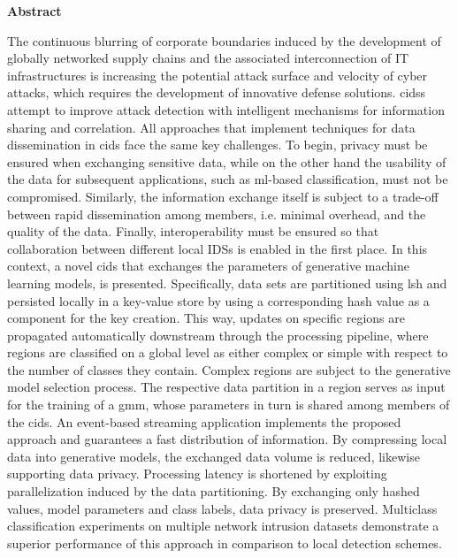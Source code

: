 \documentclass[../main.tex]{subfiles}
\begin{document}
\begingroup

\hspace{0pt}
\vfill
\begin{adjustwidth}{1.7cm}{1.7cm}
\begin{center}
    \small\textbf{Abstract}
\end{center}
\par\medskip

The continuous blurring of corporate boundaries induced by the development of globally networked supply chains and the associated interconnection of IT infrastructures is increasing the potential attack surface and velocity of cyber attacks, which requires the development of innovative defense solutions.
\glspl{cids} attempt to improve attack detection with intelligent mechanisms for information sharing and correlation.
All approaches that implement techniques for data dissemination in \gls{cids} face the same key challenges.
To begin, privacy must be ensured when exchanging sensitive data, while on the other hand the usability of the data for subsequent applications, such as \gls{ml}-based classification, must not be compromised. 
Similarly, the information exchange itself is subject to a trade-off between rapid dissemination among members, i.e. minimal overhead, and the quality of the data.
Finally, interoperability must be ensured so that collaboration between different local IDSs is enabled in the first place.
In this context, a novel \gls{cids} that exchanges the parameters of generative machine learning models, is presented. 
Specifically, data sets are partitioned using \gls{lsh} and persisted locally in a key-value store by using a corresponding hash value as a component for the key creation.
This way, updates on specific regions are propagated automatically downstream through the processing pipeline, where regions are classified on a global level as either complex or simple with respect to the number of classes they contain.
Complex regions are subject to the generative model selection process. The respective data partition in a region serves as input for the training of a \gls{gmm}, whose parameters in turn is shared among members of the \gls{cids}.
An event-based streaming application implements the proposed approach and guarantees a fast distribution of information.
By compressing local data into generative models, the exchanged data volume is reduced, likewise supporting data privacy.
Processing latency is shortened by exploiting parallelization induced by the data partitioning.
By exchanging only hashed values, model parameters and class labels, data privacy is preserved. 
Multiclass classification experiments on multiple network intrusion datasets demonstrate a superior performance of this approach in comparison to local detection schemes.
\end{adjustwidth}
\vfill
\hspace{0pt}
\par\endgroup
\bigskip\noindent
\end{document}
